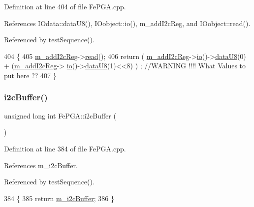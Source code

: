 Definition at line 404 of file Fe\+P\+G\+A.\+cpp.



References I\+Odata\+::data\+U8(), I\+Oobject\+::io(), m\+\_\+add\+I2c\+Reg, and I\+Oobject\+::read().



Referenced by test\+Sequence().


\begin{DoxyCode}
404                                \{
405   \hyperlink{classFePGA_af3ef3467ba803e6d3b970ea8982d6246}{m\_addI2cReg}->\hyperlink{classIOobject_aa07610c11963b1db6710e3c76ceea456}{read}();
406   \textcolor{keywordflow}{return} ( \hyperlink{classFePGA_af3ef3467ba803e6d3b970ea8982d6246}{m\_addI2cReg}->\hyperlink{classIOobject_af04fb94137c3d86849f478ac5afab5d1}{io}()->\hyperlink{classIOdata_a75e9c318dbac3a39402179070943d4bc}{dataU8}(0) + (\hyperlink{classFePGA_af3ef3467ba803e6d3b970ea8982d6246}{m\_addI2cReg}->
      \hyperlink{classIOobject_af04fb94137c3d86849f478ac5afab5d1}{io}()->\hyperlink{classIOdata_a75e9c318dbac3a39402179070943d4bc}{dataU8}(1)<<8) ) ; \textcolor{comment}{//WARNING !!!! What Values to put here ??}
407 \}
\end{DoxyCode}
\mbox{\label{classFePGA_a5577463c8478cb6d54fc3c75b26cd819}} 
\subsubsection{\texorpdfstring{i2c\+Buffer()}{i2cBuffer()}}
{\footnotesize\ttfamily unsigned long int Fe\+P\+G\+A\+::i2c\+Buffer (\begin{DoxyParamCaption}{ }\end{DoxyParamCaption})}



Definition at line 384 of file Fe\+P\+G\+A.\+cpp.



References m\+\_\+i2c\+Buffer.



Referenced by test\+Sequence().


\begin{DoxyCode}
384                                   \{
385   \textcolor{keywordflow}{return} \hyperlink{classFePGA_a173664ffd6a73f454ae31f51e689dd16}{m\_i2cBuffer};
386 \}
\end{DoxyCode}
\mbox{\label{classFePGA_a9c261a09d323c07ec4b9e925d4dfc353}} 
